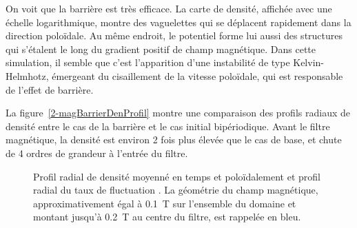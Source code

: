 \begin{refsection}
On voit que la barrière est très efficace. La carte de densité, affichée avec
une échelle logarithmique, montre des vaguelettes qui se déplacent rapidement
dans la direction poloïdale.
Au même endroit, le potentiel forme lui aussi des structures qui s'étalent le
long du gradient positif de champ magnétique. 
Dans cette simulation, il semble que c'est l'apparition d'une instabilité de
type Kelvin-Helmhotz, émergeant du cisaillement de la vitesse 
poloïdale, qui est responsable de l'effet de barrière.

La figure~\ref{2-magBarrierDenProfil} montre une comparaison des profils radiaux de
densité entre le
cas de la barrière et le cas initial bipériodique.
Avant le filtre magnétique, la densité est environ 2 fois plus élevée que le
cas de base, et chute de 4 ordres de grandeur à l'entrée du filtre.

\begin{figure}[!htbp]
    \centering
    \caption{Profil radial de densité moyenné en temps et poloïdalement
     et profil radial du taux de fluctuation
    .
    La géométrie du champ magnétique, approximativement égal à 0.1~T sur
    l'ensemble du domaine et montant jusqu'à 0.2~T au centre du filtre, est
    rappelée en bleu.}
    \label{2-ProfMagBarrier}
\end{figure} 


\end{refsection}
